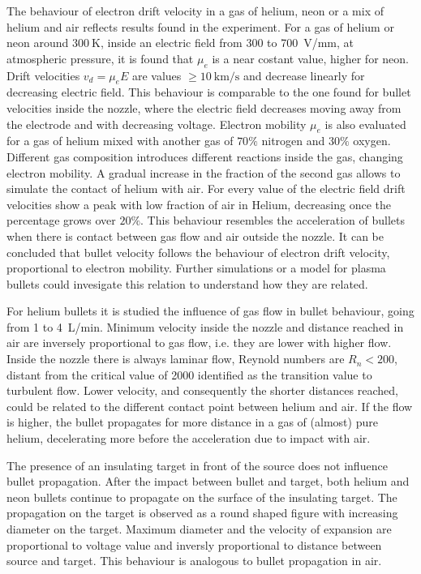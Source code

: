 The behaviour of electron drift velocity in a gas of helium, neon or a mix of helium and air reflects results found in the experiment. For a gas of helium or neon around $\SI{300}{\kelvin}$, inside an electric field from \num{300} to \SI{700}{\volt/\milli\meter}, at atmospheric pressure, it is found that $\mu_e$ is a near costant value, higher for neon. %
Drift velocities $v_{d} = \mu_e E$ are values $\ge \SI{10}{\kilo\meter/\second}$ and decrease linearly for decreasing electric field. This behaviour is comparable to the one found for bullet velocities inside the nozzle, where the electric field decreases moving away from the electrode and with decreasing voltage.
Electron mobility $\mu_e$ is also evaluated for a gas of helium mixed with another gas of $70\%$ nitrogen and $30\%$ oxygen. Different gas composition introduces different reactions inside the gas, changing electron mobility. A gradual increase in the fraction of the second gas allows to simulate the contact of helium with air. For every value of the electric field drift velocities show a peak with low fraction of air in Helium, decreasing once the percentage grows over $20\%$. This behaviour resembles the acceleration of bullets when there is contact between gas flow and air outside the nozzle.
It can be concluded that bullet velocity follows the behaviour of electron drift velocity, proportional to electron mobility. Further simulations or a model for plasma bullets could invesigate this relation to understand how they are related.


For helium bullets it is studied the influence of gas flow in bullet behaviour, going from \num{1} to \SI{4}{\liter/\minute}. Minimum velocity inside the nozzle and distance reached in air are inversely proportional to gas flow, i.e. they are lower with higher flow. Inside the nozzle there is always laminar flow, Reynold numbers are $R_n < \num{200}$, distant from the critical value of \num{2000} identified as the transition value to turbulent flow. Lower velocity, and consequently the shorter distances reached, could be related to the different contact point between helium and air. If the flow is higher, the bullet propagates for more distance in a gas of (almost) pure helium, decelerating more before the acceleration due to impact with air.

The presence of an insulating target in front of the source does not influence bullet propagation. After the impact between bullet and target, both helium and neon bullets continue to propagate on the surface of the insulating target. The propagation on the target is observed as a round shaped figure with increasing diameter on the target. Maximum diameter and the velocity of expansion are proportional to voltage value and inversly proportional to distance between source and target. This behaviour is analogous to bullet propagation in air.

